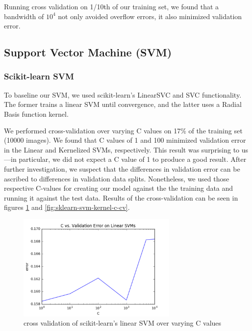 \documentclass{article} %
\begin{document}
Running cross validation on 1/10th of our training set, we found that a
bandwidth of $10^4$ not only avoided overflow errors, it also minimized validation error.

\subsection{Support Vector Machine (SVM)}
\subsubsection{Scikit-learn SVM}
To baseline our SVM,
we used scikit-learn's LinearSVC and SVC functionality. The
former trains a linear SVM until convergence, and the latter uses a Radial Basis function kernel. 

We performed cross-validation over varying C values on 17\% of
the training set (10000 images). We found that C values of 1 and 100
minimized validation error in the Linear and Kernelized SVMs, respectively.
This result was surprising to us---in particular, we did not expect a C value of
1 to produce a good result. After further investigation, we
suspect that the differences in
validation error can be ascribed to differences in validation data splits.
Nonetheless, we
used those respective C-values for creating our model against the
the training data and running it against the test data. Results of the
cross-validation can be seen in figures \ref{fig:sklearn-sv-c-cv} and \ref{fig:sklearn-svm-kernel-c-cv}.

\begin{figure}[h]
\centering
\includegraphics[width=0.7\textwidth]{sklearn-svm-c-cv.png}
\caption{cross validation of scikit-learn's linear SVM over varying C values}
\label{fig:sklearn-sv-c-cv}
\end{figure}
\end{document}
